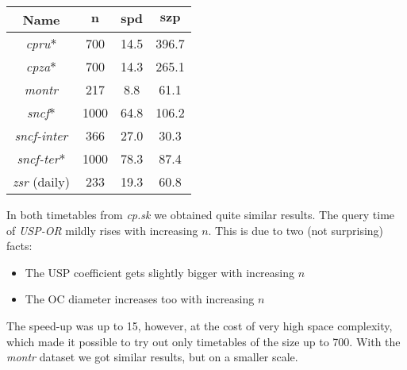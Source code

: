 		\begin{table}[H]
			\centering
			\begin{tabular}{c|c|c|c}
	            \rowcolor{tablehead}
	            \textbf{Name} & $\bm{n}$ & $\bm{spd}$ & $\bm{szp}$ \\
				\hline
				\textit{cpru}* & 700 & 14.5 & 396.7 \\
				\textit{cpza}* & 700 & 14.3 & 265.1 \\
				\textit{montr} & 217 & 8.8 & 61.1\\
				\textit{sncf}* & 1000 & 64.8 & 106.2 \\
				\textit{sncf-inter} & 366 & 27.0 & 30.3 \\
				\textit{sncf-ter}* & 1000 & 78.3 & 87.4 \\
				\textit{zsr} (daily) & 233 & 19.3 & 60.8 \\
			\end{tabular}
			\label{tab:uspor-speedup}
		\end{table}
	
		\noindent In both timetables from \textit{cp.sk} we obtained quite similar results. The query time of \textit{USP-OR} mildly rises with increasing $n$. This is due to two (not surprising) facts: 
		\begin{itemize}
			\item The USP coefficient gets slightly bigger with increasing $n$
			\item The OC diameter increases too with increasing $n$
		\end{itemize}
		\hspace{\fill}
		
		\noindent The speed-up was up to 15, however, at the cost of very high space complexity, which made it possible to try out only timetables of the size up to 700. With the \textit{montr} dataset we got similar results, but on a smaller scale.
		
		\begin{figure}[H]
		\centering
		\end{figure}
		
